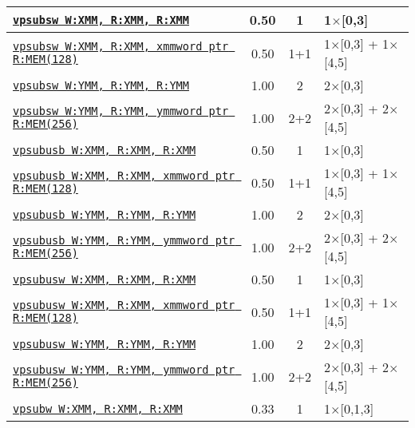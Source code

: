 \documentclass[a4paper,english,fontsize=9]{scrartcl}
\begin{document}
\begin{longtable}{p{}ccL{.25\textwidth}}
  \midrule
  \texttt{\href{https://felixcloutier.com/x86/PSUBSB:PSUBSW.html}{vpsubsw W:XMM, R:XMM, R:XMM}} & 0.50 & 1 & 1\(\times\)[0,3] \\
  \midrule
  \texttt{\href{https://felixcloutier.com/x86/PSUBSB:PSUBSW.html}{vpsubsw W:XMM, R:XMM, xmmword ptr R:MEM(128)}} & 0.50 & 1+1 & 1\(\times\)[0,3] + 1\(\times\)[4,5] \\
  \midrule
  \texttt{\href{https://felixcloutier.com/x86/PSUBSB:PSUBSW.html}{vpsubsw W:YMM, R:YMM, R:YMM}} & 1.00 & 2 & 2\(\times\)[0,3] \\
  \midrule
  \texttt{\href{https://felixcloutier.com/x86/PSUBSB:PSUBSW.html}{vpsubsw W:YMM, R:YMM, ymmword ptr R:MEM(256)}} & 1.00 & 2+2 & 2\(\times\)[0,3] + 2\(\times\)[4,5] \\
  \midrule
  \texttt{\href{https://felixcloutier.com/x86/PSUBUSB:PSUBUSW.html}{vpsubusb W:XMM, R:XMM, R:XMM}} & 0.50 & 1 & 1\(\times\)[0,3] \\
  \midrule
  \texttt{\href{https://felixcloutier.com/x86/PSUBUSB:PSUBUSW.html}{vpsubusb W:XMM, R:XMM, xmmword ptr R:MEM(128)}} & 0.50 & 1+1 & 1\(\times\)[0,3] + 1\(\times\)[4,5] \\
  \midrule
  \texttt{\href{https://felixcloutier.com/x86/PSUBUSB:PSUBUSW.html}{vpsubusb W:YMM, R:YMM, R:YMM}} & 1.00 & 2 & 2\(\times\)[0,3] \\
  \midrule
  \texttt{\href{https://felixcloutier.com/x86/PSUBUSB:PSUBUSW.html}{vpsubusb W:YMM, R:YMM, ymmword ptr R:MEM(256)}} & 1.00 & 2+2 & 2\(\times\)[0,3] + 2\(\times\)[4,5] \\
  \midrule
  \texttt{\href{https://felixcloutier.com/x86/PSUBUSB:PSUBUSW.html}{vpsubusw W:XMM, R:XMM, R:XMM}} & 0.50 & 1 & 1\(\times\)[0,3] \\
  \midrule
  \texttt{\href{https://felixcloutier.com/x86/PSUBUSB:PSUBUSW.html}{vpsubusw W:XMM, R:XMM, xmmword ptr R:MEM(128)}} & 0.50 & 1+1 & 1\(\times\)[0,3] + 1\(\times\)[4,5] \\
  \midrule
  \texttt{\href{https://felixcloutier.com/x86/PSUBUSB:PSUBUSW.html}{vpsubusw W:YMM, R:YMM, R:YMM}} & 1.00 & 2 & 2\(\times\)[0,3] \\
  \midrule
  \texttt{\href{https://felixcloutier.com/x86/PSUBUSB:PSUBUSW.html}{vpsubusw W:YMM, R:YMM, ymmword ptr R:MEM(256)}} & 1.00 & 2+2 & 2\(\times\)[0,3] + 2\(\times\)[4,5] \\
  \midrule
  \texttt{\href{https://felixcloutier.com/x86/PSUBB:PSUBW:PSUBD.html}{vpsubw W:XMM, R:XMM, R:XMM}} & 0.33 & 1 & 1\(\times\)[0,1,3] \\
  \midrule

\end{longtable}
\end{document}

